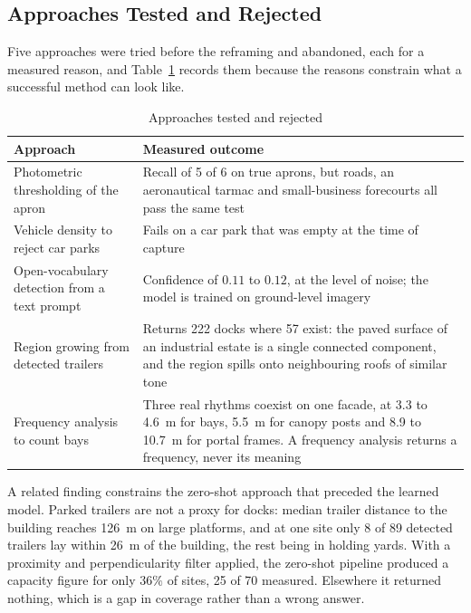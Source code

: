 \subsection*{Approaches Tested and Rejected}

Five approaches were tried before the reframing and abandoned, each for a measured reason,
and Table~\ref{tab:volume_failed} records them because the reasons constrain what a successful
method can look like.

\begin{table}[htbp]
\centering
\caption{Approaches tested and rejected}
\label{tab:volume_failed}
\small
\begin{tabularx}{\linewidth}{>{\raggedright\arraybackslash}p{4.2cm} X}
\toprule
\textbf{Approach} & \textbf{Measured outcome} \\
\midrule
Photometric thresholding of the apron & Recall of 5 of 6 on true aprons, but roads, an
aeronautical tarmac and small-business forecourts all pass the same test \\
\midrule
Vehicle density to reject car parks & Fails on a car park that was empty at the time of
capture \\
\midrule
Open-vocabulary detection from a text prompt & Confidence of $0.11$ to $0.12$, at the level
of noise; the model is trained on ground-level imagery \\
\midrule
Region growing from detected trailers & Returns 222 docks where 57 exist: the paved surface
of an industrial estate is a single connected component, and the region spills onto
neighbouring roofs of similar tone \\
\midrule
Frequency analysis to count bays & Three real rhythms coexist on one facade, at 3.3 to
4.6~m for bays, 5.5~m for canopy posts and 8.9 to 10.7~m for portal frames. A frequency
analysis returns a frequency, never its meaning \\
\bottomrule
\end{tabularx}
\end{table}

A related finding constrains the zero-shot approach that preceded the learned model. Parked
trailers are not a proxy for docks: median trailer distance to the building reaches 126~m on
large platforms, and at one site only 8 of 89 detected trailers lay within 26~m of the
building, the rest being in holding yards. With a proximity and perpendicularity filter
applied, the zero-shot pipeline produced a capacity figure for only $36\%$ of sites, 25 of
70 measured. Elsewhere it returned nothing, which is a gap in coverage rather than a wrong
answer.

